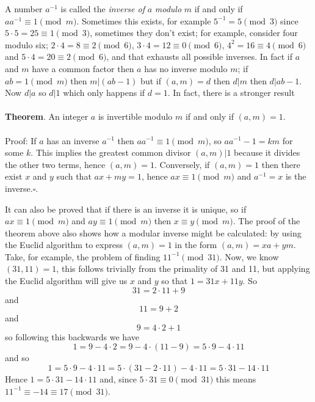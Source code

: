 \documentclass[12pt]{article}
\begin{document}
A number $a^{-1}$ is called the \textsl{inverse of }$a$\textsl{
  modulo} $m$ if and only if $aa^{-1}\equiv 1 \pmod m$. Sometimes this
exists, for example $5^{-1}=5 \pmod 3$ since $5\cdot 5=25\equiv 1
\pmod 3$, sometimes they don't exist; for example, consider four modulo
six; $2\cdot 4=8\equiv 2\pmod 6$, $3\cdot 4=12\equiv 0 \pmod 6$,
$4^2=16\equiv 4 \pmod 6$ and $5\cdot 4=20\equiv 2 \pmod 6$, and that
exhausts all possible inverses. In fact if $a$ and $m$ have a common factor then $a$ has no inverse modulo $m$; if $ab=1\pmod m$ then $m|(ab-1)$ but if $(a,m)=d$ then $d|m$ then $d|ab-1$. Now $d|a$ so $d|1$ which only happens if $d=1$. In fact, there is a stronger result\\
\\
\textbf{Theorem}. An integer $a$ is invertible modulo $m$ if and only if $(a,m)=1$.\\
\\
Proof: If $a$ has an inverse $a^{-1}$ then $aa^{-1}\equiv 1\pmod m$, so
$aa^{-1}-1=km$ for some $k$. This implies the greatest common divisor
$(a,m)|1$ because it divides the other two terms, hence
$(a,m)=1$. Conversely, if $(a,m)=1$ then there exist $x$ and $y$ such that $ax+my=1$, hence $ax\equiv 1\pmod m$ and $a^{-1}=x$ is the inverse.$\square$.

It can also be proved that if there is an inverse it is unique, so if
$ax\equiv 1 \pmod m$ and $ay\equiv 1\pmod m$ then $x\equiv y\pmod m$. The proof of the theorem above also shows how a modular inverse might be calculated: by using the Euclid algorithm to express $(a,m)=1$ in the form $(a,m)=xa+ym$. Take, for example, the problem of finding $11^{-1}\pmod {31}$. Now, we know $(31,11)=1$, this follows trivially from the primality of 31 and 11, but applying the Euclid algorithm will give us $x$ and $y$ so that $1=31x+11y$. So 
\begin{equation}
31=2\cdot 11 +9
\end{equation}
and 
\begin{equation}
11=9+2
\end{equation}
and
\begin{equation}
9=4\cdot 2+1
\end{equation}
so following this backwards we have 
 \begin{equation}
1=9-4\cdot 2=9-4\cdot (11-9)=5\cdot 9-4\cdot 11
\end{equation}
and so 
\begin{equation}
1=5\cdot 9-4\cdot 11=5\cdot(31-2\cdot 11)-4\cdot 11=5\cdot 31-14\cdot 11
\end{equation}
Hence $1=5\cdot 31 -14\cdot 11$ and, since $5\cdot 31 \equiv 0 \pmod
{31}$ this means $11^{-1}\equiv-14\equiv 17 \pmod {31}$. 
\end{document}

